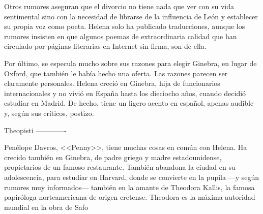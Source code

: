  Otros rumores aseguran que el divorcio no tiene nada que ver con su vida sentimental sino con la necesidad de librarse de la influencia de León y establecer su propia voz como poeta. Helena solo ha publicado traducciones, aunque los rumores insisten en que algunos poemas de extraordinaria calidad que han circulado por páginas literarias en Internet sin firma, son de ella. 
 
Por último, se especula mucho sobre sus razones para elegir Ginebra, en lugar de Oxford, que también le había hecho una oferta. Las razones parecen ser claramente personales. Helena creció en Ginebra, hija de funcionarios internacionales y no vivió en España hasta los dieciocho años, cuando decidió estudiar en Madrid. De hecho, tiene un ligero acento en español, apenas audible y, según sus críticos, postizo. 

Theopisti
-------------

Penélope Davros, <<Penny>>, tiene muchas cosas en común con Helena. Ha crecido también en Ginebra, de padre griego y madre estadounidense, propietarios de un famoso restaurante. También abandona la ciudad en su adolescencia, para estudiar en Harvard, donde se convierte en la pupila ---y según rumores muy informados--- también en la amante de Theodora Kallis, la famosa papiróloga norteamericana de origen cretense.  Theodora es la máxima autoridad mundial en la obra de Safo
 

